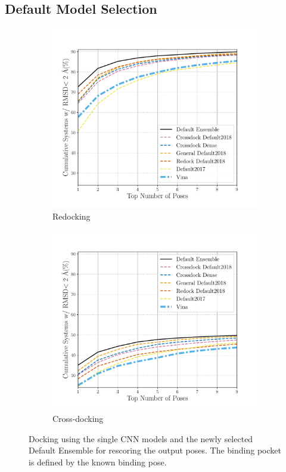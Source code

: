 \documentclass[journal=jcisd8,manuscript=article]{achemso}
\begin{document}
\subsection{Default Model Selection}
\begin{figure}
	\begin{subfigure}[b]{0.48\textwidth}
		\centering
		\includegraphics[width=\textwidth]{figures/redocking/rescore_single_models_line.pdf}
		\caption{Redocking}
		\label{fig:RescoreSingleRedock}
        \end{subfigure}    
	\begin{subfigure}[b]{0.48\textwidth}    
		\centering
		\includegraphics[width=\textwidth]{figures/crossdocking/rescore_single_models_line.pdf}
		\caption{Cross-docking}
		\label{fig:RescoreSingleCrossdock}
        \end{subfigure}    
	\caption{Docking using the single CNN models and the newly selected Default Ensemble for rescoring the output poses. The binding pocket is defined by the known binding pose.}
	\label{fig:RescoreSingle}
\end{figure}
\end{document}
